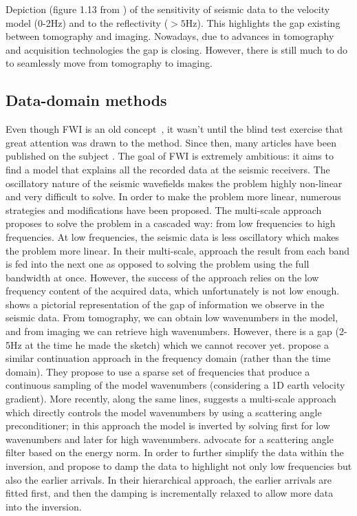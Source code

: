 %
{Depiction (figure 1.13 from \cite{Claerbout:1985:IEI:3887}) of 
 the sensitivity of seismic data to the velocity model (0-2Hz) and to the reflectivity ($> 5$Hz). This highlights
the gap existing between tomography and imaging. Nowadays, due to advances in tomography and acquisition technologies
the gap is closing. However, there is still much to do to seamlessly move from tomography to 
imaging.}



\subsection{Data-domain methods}

Even though FWI is an old concept~\citep{lailly1983seismic,tarantola,
Pratt99,Sirgue,VirieuxFWI}, 
it wasn't until the blind test exercise \citep{billette20052004}
that great attention was drawn to the method. Since then, many articles have been 
published on the subject \citep{guittonTLE} . The goal of FWI 
is extremely ambitious: it aims to find a model that explains all the recorded data
at the seismic receivers. The oscillatory nature of the seismic wavefields makes the problem
highly non-linear and very difficult to solve. In order to make the problem more
linear, numerous strategies and modifications have been proposed. The multi-scale approach \citep{Bunks95}
proposes to solve the problem in a cascaded way: from low frequencies to high frequencies. At low frequencies,
the seismic data is less oscillatory which makes the problem more linear. In their multi-scale, approach 
the result from each band is fed into the next one as opposed to solving the problem using the 
full bandwidth at once. However, the success of the approach relies on the 
low frequency content of the acquired data, which unfortunately is not 
low enough. 
  \citep{Claerbout:1985:IEI:3887} shows a pictorial representation of the gap of 
information we observe in the seismic data.  From tomography, we can obtain
low wavenumbers in the model, and from imaging we can retrieve high wavenumbers. However, there is a 
gap (2-5Hz at the time he made the sketch) which we cannot recover yet. 
 \cite{Sirgue} propose a similar continuation approach in the frequency domain (rather than the time domain). 
They propose to use a sparse set of frequencies that produce a continuous sampling 
of the model wavenumbers  (considering a 1D earth velocity gradient).
 More
recently, along the same lines, \cite{TariqWavenumber} suggests a multi-scale approach which directly controls
the model wavenumbers by using a scattering angle preconditioner; in this approach the model is inverted
by solving first for low wavenumbers and later for high wavenumbers. \cite{Rocha2015elastic} 
advocate for a scattering angle filter based on the energy norm. 
 In order to further simplify the 
data within the inversion, \cite{ShinHa.geo.2008} and \cite{shin_cha} propose to  damp the data
to highlight not only low frequencies but also the earlier arrivals. In their hierarchical 
approach, the earlier arrivals are fitted first, and then the damping is incrementally  relaxed to allow more
data into the inversion. 

